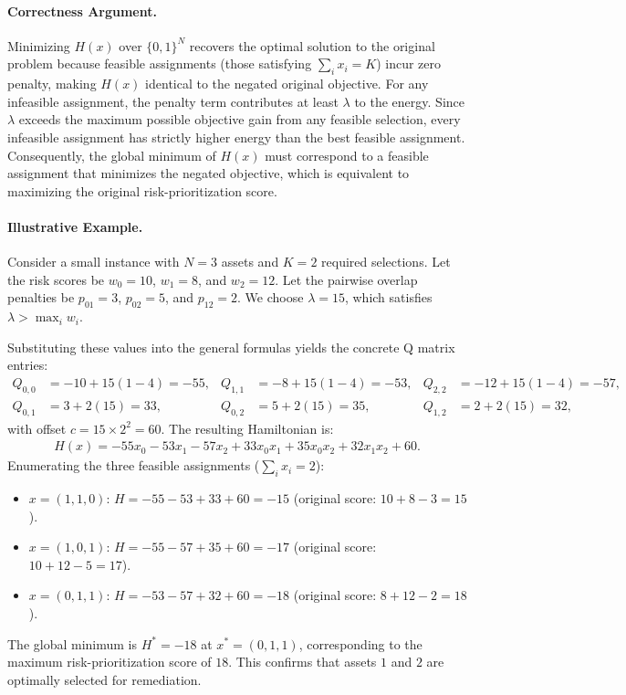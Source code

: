 \documentclass[12pt]{article}
\begin{document}
\paragraph{Correctness Argument.}
Minimizing $H(x)$ over $\{0,1\}^N$ recovers the optimal solution to the original problem because feasible assignments (those satisfying $\sum_i x_i = K$) incur zero penalty, making $H(x)$ identical to the negated original objective. For any infeasible assignment, the penalty term contributes at least $\lambda$ to the energy. Since $\lambda$ exceeds the maximum possible objective gain from any feasible selection, every infeasible assignment has strictly higher energy than the best feasible assignment. Consequently, the global minimum of $H(x)$ must correspond to a feasible assignment that minimizes the negated objective, which is equivalent to maximizing the original risk-prioritization score.

\paragraph{Illustrative Example.}
Consider a small instance with $N=3$ assets and $K=2$ required selections. Let the risk scores be $w_0 = 10$, $w_1 = 8$, and $w_2 = 12$. Let the pairwise overlap penalties be $p_{01} = 3$, $p_{02} = 5$, and $p_{12} = 2$. We choose $\lambda = 15$, which satisfies $\lambda > \max_i w_i$.

Substituting these values into the general formulas yields the concrete Q matrix entries:
\begin{align}
    Q_{0,0} &= -10 + 15(1 - 4) = -55, &
    Q_{1,1} &= -8 + 15(1 - 4) = -53, &
    Q_{2,2} &= -12 + 15(1 - 4) = -57, \\
    Q_{0,1} &= 3 + 2(15) = 33, &
    Q_{0,2} &= 5 + 2(15) = 35, &
    Q_{1,2} &= 2 + 2(15) = 32,
\end{align}
with offset $c = 15 \times 2^2 = 60$. The resulting Hamiltonian is:
\begin{align}
    H(x) = -55x_0 - 53x_1 - 57x_2 + 33x_0x_1 + 35x_0x_2 + 32x_1x_2 + 60.
\end{align}
Enumerating the three feasible assignments ($\sum_i x_i = 2$):
\begin{itemize}
    \item $x = (1,1,0)$: $H = -55 - 53 + 33 + 60 = -15$ (original score: $10+8-3=15$).
    \item $x = (1,0,1)$: $H = -55 - 57 + 35 + 60 = -17$ (original score: $10+12-5=17$).
    \item $x = (0,1,1)$: $H = -53 - 57 + 32 + 60 = -18$ (original score: $8+12-2=18$).
\end{itemize}
The global minimum is $H^* = -18$ at $x^* = (0,1,1)$, corresponding to the maximum risk-prioritization score of $18$. This confirms that assets $1$ and $2$ are optimally selected for remediation.
\end{document}
